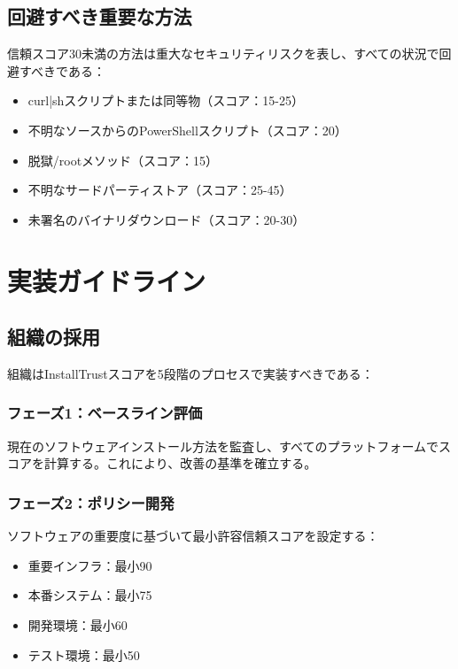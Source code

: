 \documentclass[Specialissue]{jsaiart}
\begin{document}
\subsection{回避すべき重要な方法}

信頼スコア30未満の方法は重大なセキュリティリスクを表し、すべての状況で回避すべきである：

\begin{itemize}
    \item curl|shスクリプトまたは同等物（スコア：15-25）
    \item 不明なソースからのPowerShellスクリプト（スコア：20）
    \item 脱獄/rootメソッド（スコア：15）
    \item 不明なサードパーティストア（スコア：25-45）
    \item 未署名のバイナリダウンロード（スコア：20-30）
\end{itemize}

\section{実装ガイドライン}

\subsection{組織の採用}

組織はInstallTrustスコアを5段階のプロセスで実装すべきである：

\subsubsection{フェーズ1：ベースライン評価}

現在のソフトウェアインストール方法を監査し、すべてのプラットフォームでスコアを計算する。これにより、改善の基準を確立する。

\subsubsection{フェーズ2：ポリシー開発}

ソフトウェアの重要度に基づいて最小許容信頼スコアを設定する：
\begin{itemize}
    \item 重要インフラ：最小90
    \item 本番システム：最小75
    \item 開発環境：最小60
    \item テスト環境：最小50
\end{itemize}
\end{document}
